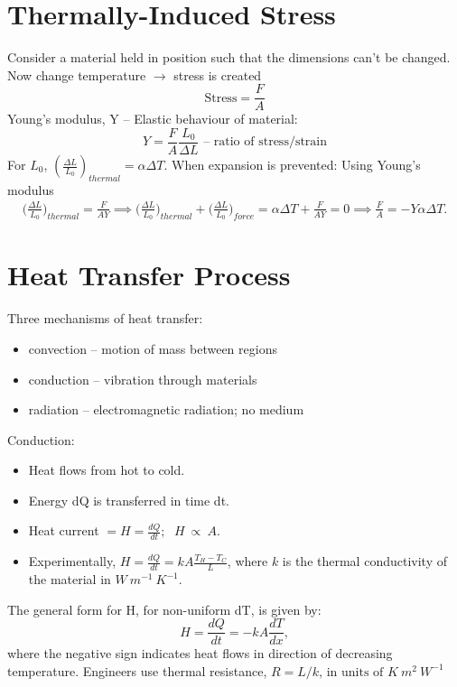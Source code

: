 \documentclass[a4paper, 11pt, normalem]{report}
\begin{document}
\section{Thermally-Induced Stress}
Consider a material held in position such that the dimensions can't be changed.
Now change temperature $\rightarrow$ stress is created
\begin{equation}
	\text{Stress} = \frac{F}{A}
\end{equation}
Young's modulus, Y -- Elastic behaviour of material:
\begin{equation}
	Y = \frac{F}{A}\frac{L_{0}}{{\Delta}L} \text{ -- ratio of stress/strain}
\end{equation}
For $L_{0}$, $(\frac{{\Delta}L}{L_{0}})_{thermal} = \alpha{\Delta}T$.
When expansion is prevented: Using Young's modulus
\begin{align}
	\bigg(\frac{{\Delta}L}{L_{0}}\bigg)_{thermal} = \frac{F}{AY} \implies \bigg(\frac{{\Delta}L}{L_{0}}\bigg)_{thermal} + \bigg(\frac{{\Delta}L}{L_{0}}\bigg)_{force} = \alpha{\Delta}T + \frac{F}{AY} = 0 \implies \frac{F}{A} = -Y\alpha{\Delta}T.
\end{align}

\section{Heat Transfer Process}
Three mechanisms of heat transfer:
\begin{itemize}
	\item convection -- motion of mass between regions
	\item conduction -- vibration through materials
	\item radiation -- electromagnetic radiation; no medium
\end{itemize}
Conduction: 
\begin{itemize}
    \item Heat flows from hot to cold.
    \item Energy dQ is transferred in time dt.
    \item Heat current $= H = \frac{dQ}{dt} \text{; }~~ H~\propto~A$.
    \item Experimentally, $H = \frac{dQ}{dt} = kA\frac{T_{H}-T_{C}}{L}$, where $k$ is the thermal conductivity of the material in $W~m^{-1}~K^{-1}$.
\end{itemize}
The general form for H, for non-uniform dT, is given by:
\begin{equation}
	H = \frac{dQ}{dt} = -kA\frac{dT}{dx},
\end{equation}
where the negative sign indicates heat flows in direction of decreasing temperature.
Engineers use thermal resistance, $R = L/k \text{, in units of } K~m^{2}~W^{-1}$
\end{document}
